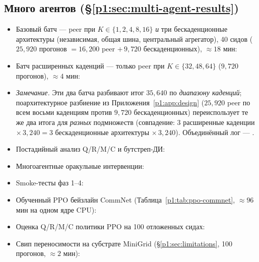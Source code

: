 \documentclass{article}
\begin{document}
\subsection*{Много агентов (\S\ref{p1:sec:multi-agent-results})}
\begin{itemize}[leftmargin=16pt]
\item Базовый батч --- peer при $K\in\{1,2,4,8,16\}$ \emph{и} три бескаденционные архитектуры (независимая, общая шина, центральный агрегатор), 40 сидов ($25{,}920$ прогонов $=16{,}200$ peer $+\,9{,}720$ бескаденционных), $\approx 18$ мин:
\item Батч расширенных каденций --- только peer при $K\in\{32,48,64\}$ ($9{,}720$ прогонов), $\approx 4$ мин:
\item[] \emph{Замечание.} Эти два батча разбивают итог $35{,}640$ по \emph{диапазону каденций}; поархитектурное разбиение из Приложения~\ref{p1:app:design} ($25{,}920$ peer по всем восьми каденциям против $9{,}720$ бескаденционных) переиспользует те же два итога для \emph{разных} подмножеств (совпадение: $3$ расширенные каденции $\times\,3{,}240 = 3$ бескаденционные архитектуры $\times\,3{,}240$). Объединённый лог --- .
\item Постадийный анализ Q/R/M/C и бутстреп-ДИ:
\item Многоагентные оракульные интервенции:
\item Smoke-тесты фаз 1--4:
\item Обученный PPO бейзлайн CommNet (Таблица~\ref{p1:tab:ppo-commnet}, $\approx 96$ мин на одном ядре CPU):
\item Оценка Q/R/M/C политики PPO на 100 отложенных сидах:
\item Свип переносимости на субстрате MiniGrid (\S\ref{p1:sec:limitations}, 100 прогонов, $\approx 2$ мин):
\end{itemize}
\end{document}
